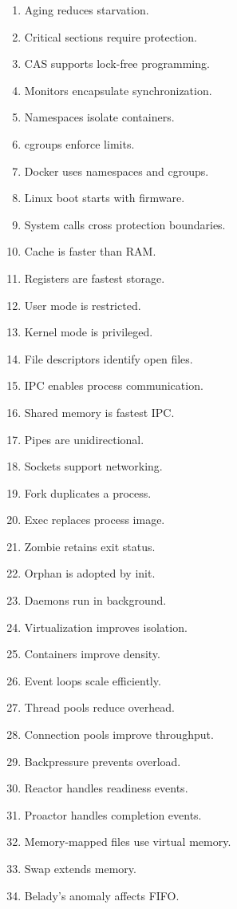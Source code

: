 \begin{enumerate}
\item Aging reduces starvation.
\item Critical sections require protection.
\item CAS supports lock-free programming.
\item Monitors encapsulate synchronization.
\item Namespaces isolate containers.
\item cgroups enforce limits.
\item Docker uses namespaces and cgroups.
\item Linux boot starts with firmware.
\item System calls cross protection boundaries.
\item Cache is faster than RAM.
\item Registers are fastest storage.
\item User mode is restricted.
\item Kernel mode is privileged.
\item File descriptors identify open files.
\item IPC enables process communication.
\item Shared memory is fastest IPC.
\item Pipes are unidirectional.
\item Sockets support networking.
\item Fork duplicates a process.
\item Exec replaces process image.
\item Zombie retains exit status.
\item Orphan is adopted by init.
\item Daemons run in background.
\item Virtualization improves isolation.
\item Containers improve density.
\item Event loops scale efficiently.
\item Thread pools reduce overhead.
\item Connection pools improve throughput.
\item Backpressure prevents overload.
\item Reactor handles readiness events.
\item Proactor handles completion events.
\item Memory-mapped files use virtual memory.
\item Swap extends memory.
\item Belady's anomaly affects FIFO.

\end{enumerate}

